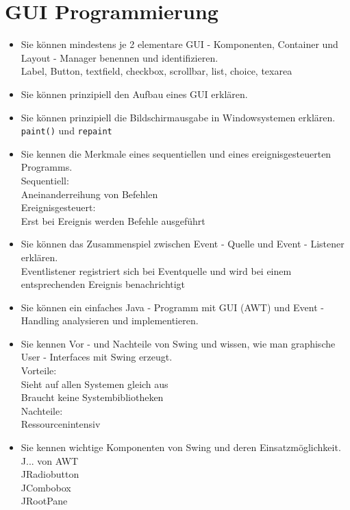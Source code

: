 \documentclass[a4paper, 10pt]{article}
\begin{document}
\section{GUI Programmierung}
\begin{itemize}
  \item Sie können mindestens je 2 elementare GUI - Komponenten, Container und Layout - Manager benennen und identifizieren. \\
        Label, Button, textfield, checkbox, scrollbar, list, choice, texarea 
  \item Sie können prinzipiell den Aufbau eines GUI erklären. \\
        
  \item Sie können prinzipiell die Bildschirmausgabe in Windowsystemen erklären. \\
        \verb!paint()! und \verb!repaint!
  \item Sie kennen die Merkmale eines sequentiellen und eines ereignisgesteuerten Programms. \\
        Sequentiell: \\
        Aneinanderreihung von Befehlen\\
        Ereignisgesteuert: \\
        Erst bei Ereignis werden Befehle ausgeführt
  \item Sie können das Zusammenspiel zwischen Event - Quelle und Event - Listener erklären. \\
        Eventlistener registriert sich bei Eventquelle und wird bei einem entsprechenden Ereignis benachrichtigt
  \item Sie können ein einfaches Java - Programm mit GUI (AWT) und Event - Handling analysieren und implementieren. \\
        
  \item Sie kennen Vor - und Nachteile von Swing und wissen, wie man graphische User - Interfaces mit Swing erzeugt. \\
        Vorteile: \\
        Sieht auf allen Systemen gleich aus \\
        Braucht keine Systembibliotheken \\
        Nachteile: \\
        Ressourcenintensiv
  \item Sie kennen wichtige Komponenten von Swing und deren Einsatzmöglichkeit. \\
        J... von AWT\\
        JRadiobutton \\
        JCombobox \\
        JRootPane
\end{itemize}
\end{document}
